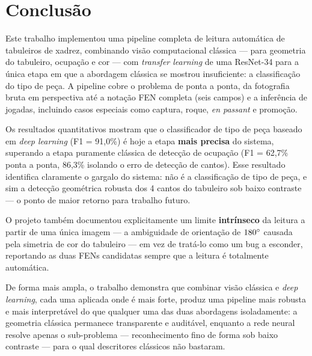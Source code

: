\section{Conclusão}

Este trabalho implementou uma pipeline completa de leitura automática de tabuleiros de
xadrez, combinando visão computacional clássica --- para geometria do tabuleiro,
ocupação e cor --- com \textit{transfer learning} de uma ResNet-34 para a única etapa em
que a abordagem clássica se mostrou insuficiente: a classificação do tipo de peça. A
pipeline cobre o problema de ponta a ponta, da fotografia bruta em perspectiva até a
notação FEN completa (seis campos) e a inferência de jogadas, incluindo casos especiais
como captura, roque, \textit{en passant} e promoção.

Os resultados quantitativos mostram que o classificador de tipo de peça baseado em
\textit{deep learning} (F1 = 91,0\%) é hoje a etapa \textbf{mais precisa} do sistema,
superando a etapa puramente clássica de detecção de ocupação (F1 = 62,7\% ponta a ponta,
86,3\% isolando o erro de detecção de cantos). Esse resultado identifica claramente o
gargalo do sistema: não é a classificação de tipo de peça, e sim a detecção geométrica
robusta dos 4 cantos do tabuleiro sob baixo contraste --- o ponto de maior retorno para
trabalho futuro.

O projeto também documentou explicitamente um limite \textbf{intrínseco} da leitura a
partir de uma única imagem --- a ambiguidade de orientação de $180\degree$ causada pela
simetria de cor do tabuleiro --- em vez de tratá-lo como um bug a esconder, reportando as
duas FENs candidatas sempre que a leitura é totalmente automática.

De forma mais ampla, o trabalho demonstra que combinar visão clássica e \textit{deep
learning}, cada uma aplicada onde é mais forte, produz uma pipeline mais robusta e mais
interpretável do que qualquer uma das duas abordagens isoladamente: a geometria clássica
permanece transparente e auditável, enquanto a rede neural resolve apenas o
sub-problema --- reconhecimento fino de forma sob baixo contraste --- para o qual
descritores clássicos não bastaram.
